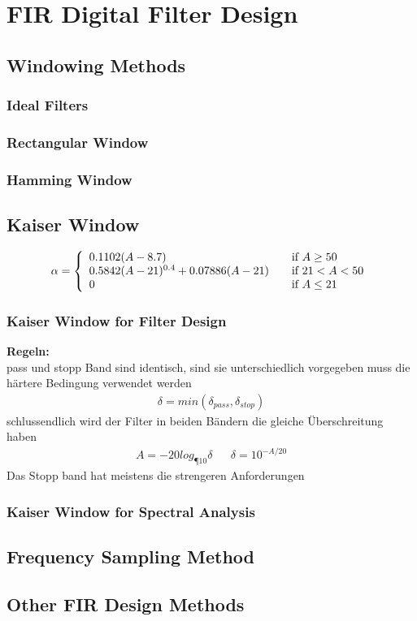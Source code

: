 \section{FIR Digital Filter Design}

\subsection{Windowing Methods}
\subsubsection{Ideal Filters}
\subsubsection{Rectangular Window}
\subsubsection{Hamming Window}

\subsection{Kaiser Window}
\begin{align*}
	\alpha = \left\{
		\begin{array}{l l}
			0.1102(A-8.7)& \quad \text{if } A \geq 50\\
			0.5842(A-21)^{0.4}+0.07886(A-21) & \quad \text{if }21 < A < 50\\
			0 & \quad \text{if } A \leq 21
		\end{array} \right.
\end{align*}
\subsubsection{Kaiser Window for Filter Design}


\textbf{Regeln:}\\
pass und stopp Band sind identisch, sind sie unterschiedlich vorgegeben muss die härtere Bedingung verwendet werden \\
\begin{align*}
\delta=min(\delta_{pass},\delta_{stop})
\end{align*}
schlussendlich wird der Filter in beiden Bändern die gleiche Überschreitung haben
\begin{align*}
A=-20log_{¶10}\delta && \delta=10^{-A/20}
\end{align*}
Das Stopp band hat meistens die strengeren Anforderungen
\subsubsection{Kaiser Window for Spectral Analysis}
\subsection{Frequency Sampling Method}

\subsection{Other FIR Design Methods}

